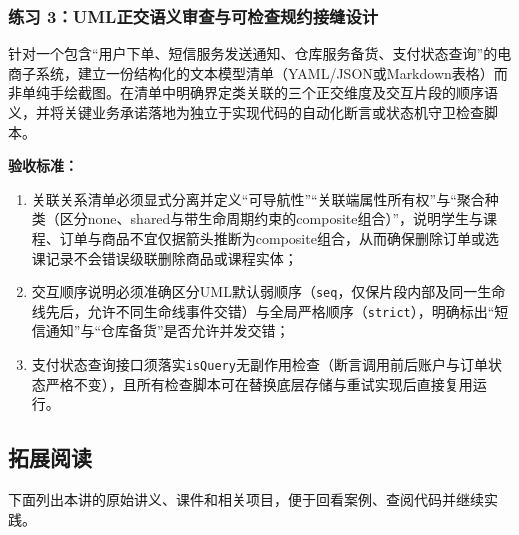 \documentclass[UTF8,a4paper,11pt,fontset=fandol]{ctexart}
\begin{document}
\subsubsection*{练习 3：UML正交语义审查与可检查规约接缝设计}

针对一个包含“用户下单、短信服务发送通知、仓库服务备货、支付状态查询”的电商子系统，建立一份结构化的文本模型清单（YAML/JSON或Markdown表格）而非单纯手绘截图。在清单中明确界定类关联的三个正交维度及交互片段的顺序语义，并将关键业务承诺落地为独立于实现代码的自动化断言或状态机守卫检查脚本。

\par{}\textbf{验收标准：}

\begin{enumerate}
\item 关联关系清单必须显式分离并定义“可导航性”“关联端属性所有权”与“聚合种类（区分none、shared与带生命周期约束的composite组合）”，说明学生与课程、订单与商品不宜仅据箭头推断为composite组合，从而确保删除订单或选课记录不会错误级联删除商品或课程实体；

\item 交互顺序说明必须准确区分UML默认弱顺序（\texttt{seq}，仅保片段内部及同一生命线先后，允许不同生命线事件交错）与全局严格顺序（\texttt{strict}），明确标出“短信通知”与“仓库备货”是否允许并发交错；

\item 支付状态查询接口须落实\texttt{isQuery}无副作用检查（断言调用前后账户与订单状态严格不变），且所有检查脚本可在替换底层存储与重试实现后直接复用运行。
\end{enumerate}

\subsection{拓展阅读}

下面列出本讲的原始讲义、课件和相关项目，便于回看案例、查阅代码并继续实践。
\end{document}
